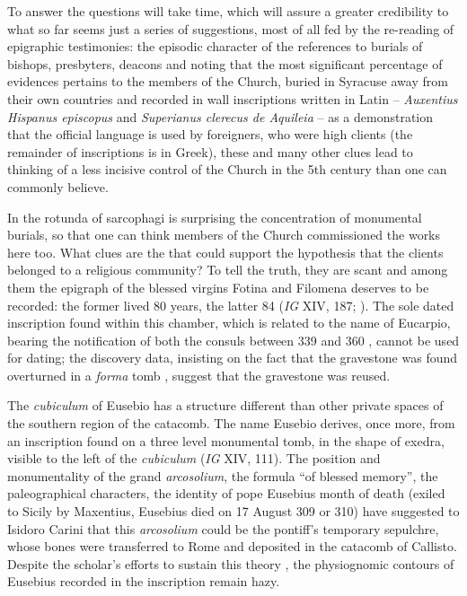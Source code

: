 \documentclass[amsthm,ebook]{saparticle}
\begin{document}
To answer the questions will take time, which will assure a greater credibility to what so far seems just a series of suggestions, most of all fed by the re-reading of epigraphic testimonies: the episodic character of the references to burials of bishops, presbyters, deacons and noting that the most significant percentage of evidences pertains to the members of the Church, buried in Syracuse away from their own countries and recorded in wall inscriptions written in Latin – \emph{Auxentius Hispanus episcopus} and \emph{Superianus clerecus de Aquileia} \citep[1 and 6]{FERRUA1940} – as a demonstration that the official language is used by foreigners, who were high clients (the remainder of inscriptions is in Greek), these and many other clues lead to thinking of a less incisive control of the Church in the 5th century than one can commonly believe.

In the rotunda of sarcophagi is surprising the concentration of monumental burials, so that one can think members of the Church commissioned the works here too. What clues are the that could support the hypothesis that the clients belonged to a religious community? To tell the truth, they are scant and among them the epigraph of the blessed virgins Fotina and Filomena deserves to be recorded: the former lived 80 years, the latter 84 (\emph{IG} XIV, 187; \citealp[180]{FERRUA1989}). The sole dated inscription found within this chamber, which is related to the name of Eucarpio, bearing the notification of both the consuls between 339 and 360 \citep[3]{FERRUA1983}, cannot be used for dating; the discovery data, insisting on the fact that the gravestone was found overturned in a \emph{forma} tomb \citep[30-31]{AGNELLO1960}, suggest that the gravestone was reused.

The \emph{cubiculum} of Eusebio has a structure different than other private spaces of the southern region of the catacomb. The name Eusebio derives, once more, from an inscription found on a three level monumental tomb, in the shape of exedra, visible to the left of the \emph{cubiculum} (\emph{IG} XIV, 111). The position and monumentality of the grand \emph{arcosolium}, the formula ``of blessed memory'', the paleographical characters, the identity of pope Eusebius month of death (exiled to Sicily by Maxentius, Eusebius died on 17 August 309 or 310) have suggested to Isidoro Carini that this \emph{arcosolium} could be the pontiff’s temporary sepulchre, whose bones were transferred to Rome and deposited in the catacomb of Callisto. Despite the scholar’s efforts to sustain this theory \citep[134]{CARINI1873}, the physiognomic contours of Eusebius recorded in the inscription remain hazy.
\end{document}
